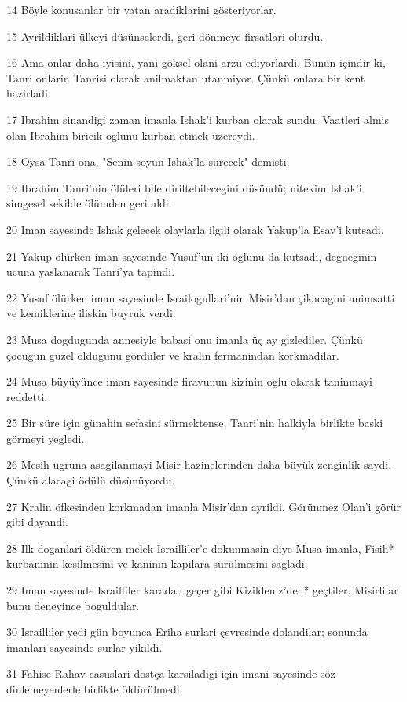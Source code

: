 \par 14 Böyle konusanlar bir vatan aradiklarini gösteriyorlar.
\par 15 Ayrildiklari ülkeyi düsünselerdi, geri dönmeye firsatlari olurdu.
\par 16 Ama onlar daha iyisini, yani göksel olani arzu ediyorlardi. Bunun içindir ki, Tanri onlarin Tanrisi olarak anilmaktan utanmiyor. Çünkü onlara bir kent hazirladi.
\par 17 Ibrahim sinandigi zaman imanla Ishak'i kurban olarak sundu. Vaatleri almis olan Ibrahim biricik oglunu kurban etmek üzereydi.
\par 18 Oysa Tanri ona, "Senin soyun Ishak'la sürecek" demisti.
\par 19 Ibrahim Tanri'nin ölüleri bile diriltebilecegini düsündü; nitekim Ishak'i simgesel sekilde ölümden geri aldi.
\par 20 Iman sayesinde Ishak gelecek olaylarla ilgili olarak Yakup'la Esav'i kutsadi.
\par 21 Yakup ölürken iman sayesinde Yusuf'un iki oglunu da kutsadi, degneginin ucuna yaslanarak Tanri'ya tapindi.
\par 22 Yusuf ölürken iman sayesinde Israilogullari'nin Misir'dan çikacagini animsatti ve kemiklerine iliskin buyruk verdi.
\par 23 Musa dogdugunda annesiyle babasi onu imanla üç ay gizlediler. Çünkü çocugun güzel oldugunu gördüler ve kralin fermanindan korkmadilar.
\par 24 Musa büyüyünce iman sayesinde firavunun kizinin oglu olarak taninmayi reddetti.
\par 25 Bir süre için günahin sefasini sürmektense, Tanri'nin halkiyla birlikte baski görmeyi yegledi.
\par 26 Mesih ugruna asagilanmayi Misir hazinelerinden daha büyük zenginlik saydi. Çünkü alacagi ödülü düsünüyordu.
\par 27 Kralin öfkesinden korkmadan imanla Misir'dan ayrildi. Görünmez Olan'i görür gibi dayandi.
\par 28 Ilk doganlari öldüren melek Israilliler'e dokunmasin diye Musa imanla, Fisih* kurbaninin kesilmesini ve kaninin kapilara sürülmesini sagladi.
\par 29 Iman sayesinde Israilliler karadan geçer gibi Kizildeniz'den* geçtiler. Misirlilar bunu deneyince boguldular.
\par 30 Israilliler yedi gün boyunca Eriha surlari çevresinde dolandilar; sonunda imanlari sayesinde surlar yikildi.
\par 31 Fahise Rahav casuslari dostça karsiladigi için imani sayesinde söz dinlemeyenlerle birlikte öldürülmedi.
